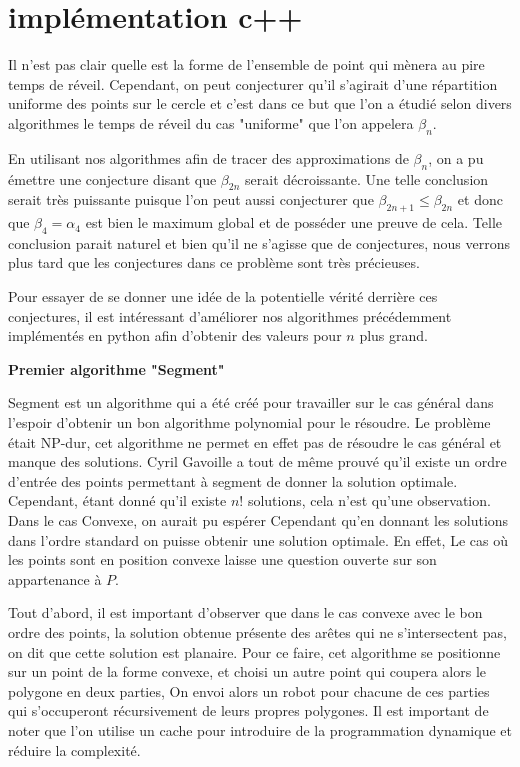 \section{implémentation c++}

Il n'est pas clair quelle est la forme de l'ensemble de point qui mènera au pire temps de réveil. Cependant, on peut conjecturer qu'il s'agirait d'une répartition uniforme des points sur le cercle et c'est dans ce but que l'on a étudié selon divers algorithmes le temps de réveil du cas "uniforme" que l'on appelera $\beta_n$.

En utilisant nos algorithmes afin de tracer des approximations de $\beta_n$, on a pu émettre une conjecture disant que $\beta_{2n}$ serait décroissante. Une telle conclusion serait très puissante puisque l'on peut aussi conjecturer que $\beta_{2n + 1} \leq \beta_{2n}$ et donc que $\beta_4 = \alpha_4$ est bien le maximum global et de posséder une preuve de cela.
Telle conclusion parait naturel et bien qu'il ne s'agisse que de conjectures, nous verrons plus tard que les conjectures dans ce problème sont très précieuses.

Pour essayer de se donner une idée de la potentielle vérité derrière ces conjectures, il est intéressant d'améliorer nos algorithmes précédemment implémentés en python afin d'obtenir des valeurs pour $n$ plus grand.

\textbf{\Large{Premier algorithme "Segment"}}

Segment est un algorithme qui a été créé pour travailler sur le cas général dans l'espoir d'obtenir un bon algorithme polynomial pour le résoudre. Le problème était NP-dur, cet algorithme ne permet en effet pas de résoudre le cas général et manque des solutions. Cyril Gavoille a tout de même prouvé qu'il existe un ordre d'entrée des points permettant à segment de donner la solution optimale. Cependant, étant donné qu'il existe $n!$ solutions, cela n'est qu'une observation.
Dans le cas Convexe, on aurait pu espérer Cependant qu'en donnant les solutions dans l'ordre standard on puisse obtenir une solution optimale. En effet, Le cas où les points sont en position convexe laisse une question ouverte sur son appartenance à $P$. 

Tout d'abord, il est important d'observer que dans le cas convexe avec le bon ordre des points, la solution obtenue présente des arêtes qui ne s'intersectent pas, on dit que cette solution est planaire. 
Pour ce faire, cet algorithme se positionne sur un point de la forme convexe, et choisi un autre point qui coupera alors le polygone en deux parties, On envoi alors un robot pour chacune de ces parties qui s'occuperont récursivement de leurs propres polygones.
Il est important de noter que l'on utilise un cache pour introduire de la programmation dynamique et réduire la complexité.

